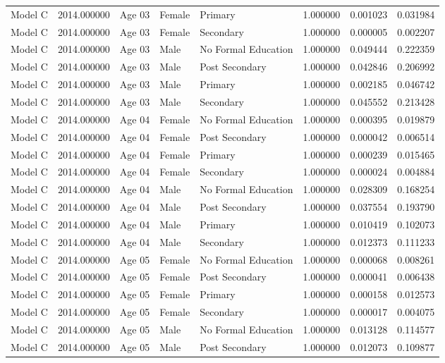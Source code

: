 \begin{table}[ht]
\begin{tabular}{lrlllrrr}
Model C & 2014.000000 & Age 03 & Female & Primary & 1.000000 & 0.001023 & 0.031984 \\
Model C & 2014.000000 & Age 03 & Female & Secondary & 1.000000 & 0.000005 & 0.002207 \\
Model C & 2014.000000 & Age 03 & Male & No Formal Education & 1.000000 & 0.049444 & 0.222359 \\
Model C & 2014.000000 & Age 03 & Male & Post Secondary & 1.000000 & 0.042846 & 0.206992 \\
Model C & 2014.000000 & Age 03 & Male & Primary & 1.000000 & 0.002185 & 0.046742 \\
Model C & 2014.000000 & Age 03 & Male & Secondary & 1.000000 & 0.045552 & 0.213428 \\
Model C & 2014.000000 & Age 04 & Female & No Formal Education & 1.000000 & 0.000395 & 0.019879 \\
Model C & 2014.000000 & Age 04 & Female & Post Secondary & 1.000000 & 0.000042 & 0.006514 \\
Model C & 2014.000000 & Age 04 & Female & Primary & 1.000000 & 0.000239 & 0.015465 \\
Model C & 2014.000000 & Age 04 & Female & Secondary & 1.000000 & 0.000024 & 0.004884 \\
Model C & 2014.000000 & Age 04 & Male & No Formal Education & 1.000000 & 0.028309 & 0.168254 \\
Model C & 2014.000000 & Age 04 & Male & Post Secondary & 1.000000 & 0.037554 & 0.193790 \\
Model C & 2014.000000 & Age 04 & Male & Primary & 1.000000 & 0.010419 & 0.102073 \\
Model C & 2014.000000 & Age 04 & Male & Secondary & 1.000000 & 0.012373 & 0.111233 \\
Model C & 2014.000000 & Age 05 & Female & No Formal Education & 1.000000 & 0.000068 & 0.008261 \\
Model C & 2014.000000 & Age 05 & Female & Post Secondary & 1.000000 & 0.000041 & 0.006438 \\
Model C & 2014.000000 & Age 05 & Female & Primary & 1.000000 & 0.000158 & 0.012573 \\
Model C & 2014.000000 & Age 05 & Female & Secondary & 1.000000 & 0.000017 & 0.004075 \\
Model C & 2014.000000 & Age 05 & Male & No Formal Education & 1.000000 & 0.013128 & 0.114577 \\
Model C & 2014.000000 & Age 05 & Male & Post Secondary & 1.000000 & 0.012073 & 0.109877 \\

\end{tabular}
\end{table}
